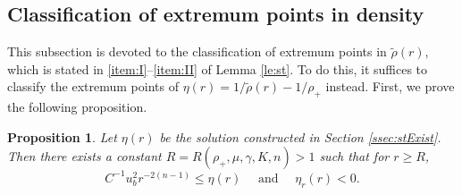\documentclass[a4paper,12pt,draft]{article}
\newtheorem{proposition}[theorem]{Proposition}
\theoremstyle{remark}
\def\rt{\tilde{\rho}}
\begin{document}
\subsection{Classification of extremum points in density}\label{ssec:extremum}
This subsection is devoted to the classification of extremum points in $\rt(r)$, which is stated in \ref{item:I}--\ref{item:II} of Lemma \ref{le:st}. To do this, it suffices to classify the extremum points of $\eta(r)= 1/\rt(r) - 1/\rho_+$ instead. First, we prove the following proposition.
\begin{proposition}\label{prop:etalr}
    Let $\eta(r)$ be the solution constructed in Section \ref{ssec:stExist}. Then there exists a constant $R=R(\rho_+,\mu,\gamma,K,n)>1$ such that for $r\ge R$,
    \begin{equation}\label{etalr}
        C^{-1} u_b^2 r^{-2(n-1)} \le \eta(r) \quad \text{ and } \quad \eta_r(r)<0.
    \end{equation}
\end{proposition}
\end{document}
